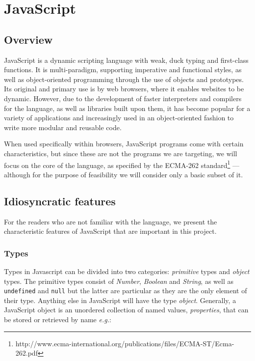 \documentclass[a4paper,11pt,titlepage]{report}
\begin{document}
\section{JavaScript}
\subsection{Overview}

JavaScript is a dynamic scripting language with weak, duck typing and first-class functions. It is multi-paradigm, supporting imperative and functional styles, as well as object-oriented programming through the use of objects and prototypes. Its original and primary use is by web browsers, where it enables websites to be dynamic. However, due to the development of faster interpreters and compilers for the language, as well as libraries built upon them, it has become popular for a variety of applications and increasingly used in an object-oriented fashion to write more modular and reusable code.

When used specifically within browsers, JavaScript programs come with certain characteristics, but since these are not the programs we are targeting, we will focus on the core of the language, as specified by the ECMA-262 standard\footnote{http://www.ecma-international.org/publications/files/ECMA-ST/Ecma-262.pdf} --- although for the purpose of feasibility we will consider only a basic subset of it.

\subsection{Idiosyncratic features}
For the readers who are not familiar with the language, we present the characteristic features of JavaScript \cite{flanagan2006javascript} that are important in this project.

\subsubsection{Types}
Types in Javascript can be divided into two categories: \emph{primitive} types and \emph{object} types. The primitive types consist of \emph{Number}, \emph{Boolean} and \emph{String}, as well as \texttt{undefined} and \texttt{null} but the latter are particular as they are the only element of their type. Anything else in JavaScript will have the type \emph{object}. Generally, a JavaScript object is an unordered collection of named values, \emph{properties}, that can be stored or retrieved by name \emph{e.g.}:
\end{document}
